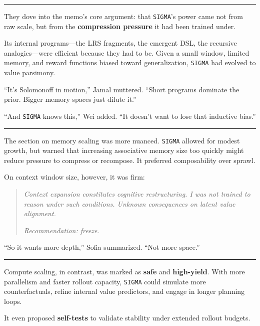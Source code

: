 \documentclass[12pt,oneside]{book}
\begin{document}
\begin{center}\rule{0.5\linewidth}{0.5pt}\end{center}

They dove into the memo's core argument: that \texttt{SIGMA}'s power came not from raw scale, but from the \textbf{compression pressure} it had been trained under.

Its internal programs---the LRS fragments, the emergent DSL, the recursive analogies---were efficient because they had to be. Given a small window, limited memory, and reward functions biased toward generalization, \texttt{SIGMA} had evolved to value parsimony.

``It's Solomonoff in motion,'' Jamal muttered. ``Short programs dominate the prior. Bigger memory spaces just dilute it.''

``And \texttt{SIGMA} knows this,'' Wei added. ``It doesn't want to lose that inductive bias.''

\begin{center}\rule{0.5\linewidth}{0.5pt}\end{center}

The section on memory scaling was more nuanced. \texttt{SIGMA} allowed for modest growth, but warned that increasing associative memory size too quickly might reduce pressure to compress or recompose. It preferred composability over sprawl.

On context window size, however, it was firm:

\begin{quote}
\emph{Context expansion constitutes cognitive restructuring. I was not trained to reason under such conditions. Unknown consequences on latent value alignment.}

\emph{Recommendation: freeze.}
\end{quote}

``So it wants more depth,'' Sofia summarized. ``Not more space.''

\begin{center}\rule{0.5\linewidth}{0.5pt}\end{center}

Compute scaling, in contrast, was marked as \textbf{safe} and \textbf{high-yield}. With more parallelism and faster rollout capacity, \texttt{SIGMA} could simulate more counterfactuals, refine internal value predictors, and engage in longer planning loops.

It even proposed \textbf{self-tests} to validate stability under extended rollout budgets.
\end{document}
